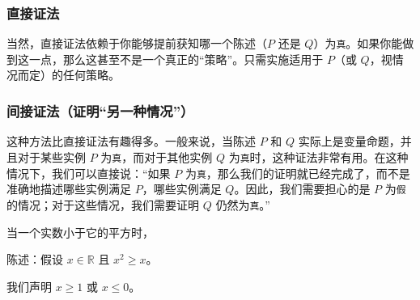 \subsubsection*{直接证法}

\begin{center}
\noindent {}
\end{center}

当然，直接证法依赖于你能够提前获知哪一个陈述（$P$ 还是 $Q$）为\verb|真|。如果你能做到这一点，那么这甚至不是一个真正的``策略''。只需实施适用于 $P$（或 $Q$，视情况而定）的任何策略。

\subsubsection*{间接证法（证明``另一种情况''）}

这种方法比直接证法有趣得多。一般来说，当陈述 $P$ 和 $Q$ 实际上是变量命题，并且对于某些实例 $P$ 为\verb|真|，而对于其他实例 $Q$ 为\verb|真|时，这种证法非常有用。在这种情况下，我们可以直接说：``如果 $P$ 为\verb|真|，那么我们的证明就已经完成了，而不是准确地描述哪些实例满足 $P$，哪些实例满足 $Q$。因此，我们需要担心的是 $P$ 为\verb|假|的情况；对于这些情况，我们需要证明 $Q$ 仍然为\verb|真|。''

\begin{center}
    \noindent {}
\end{center}

\begin{example}
    当一个实数小于它的平方时，
  
    陈述：假设 $ x \in \mathbb{R}$ 且 $x^2 \ge x$。

    我们声明 $x \ge 1$ 或 $x \le 0$。
\end{example}

